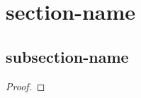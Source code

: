 \section{section-name}      

\subsection{subsection-name}

\begin{definition}
\end{definition}

\begin{example}
\end{example}


\begin{example}
\end{example}

\begin{proposition}
\end{proposition}

\begin{theorem}
\end{theorem}


\begin{proof}
\end{proof}

\begin{corollary}
\end{corollary}

\begin{proposition}
\end{proposition}





